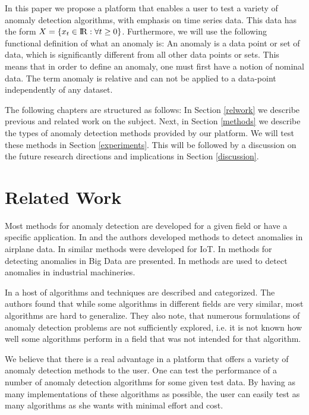 \documentclass[a4paper, 10pt]{article}
\begin{document}
In this paper we propose a platform that enables a user to test a variety of anomaly detection algorithms, with emphasis on time series data. This data has the form $X = \{x_t \in {\rm I\!R} : \forall t \ge 0\}$. Furthermore, we will use the following functional definition of what an anomaly is: An anomaly is a data point or set of data, which is significantly different from all other data points or sets. This means that in order to define an anomaly, one must first have a notion of nominal data. The term anomaly is relative and can not be applied to a data-point independently of any dataset.

The following chapters are structured as follows: In Section \ref{relwork} we describe previous and related work on the subject. Next, in Section \ref{methods} we describe the types of anomaly detection methods provided by our platform. We will test these methods in Section \ref{experiments}. This will be followed by a discussion on the future research directions and implications in Section \ref{discussion}.

\section{Related Work \label{relwork}}

Most methods for anomaly detection are developed for a given field or have a specific application. In \cite{nnfd1994} and \cite{MMAD2006} the authors developed methods to detect anomalies in airplane data. In \cite{ghad2018} similar methods were developed for IoT. In \cite{ADDSCIL} methods for detecting anomalies in Big Data are presented. In \cite{NDTSDII1996} methods are used to detect anomalies in industrial machineries.

In \cite{outlierSurvey2014} a host of algorithms and techniques are described and categorized. The authors found that while some algorithms in different fields are very similar, most algorithms are hard to generalize. They also note, that numerous formulations of anomaly detection problems are not sufficiently explored, i.e. it is not known how well some algorithms perform in a field that was not intended for that algorithm.

We believe that there is a real advantage in a platform that offers a variety of anomaly detection methods to the user. One can test the performance of a number of anomaly detection algorithms for some given test data. By having as many implementations of these algorithms as possible, the user can easily test as many algorithms as she wants with minimal effort and cost.
\end{document}
